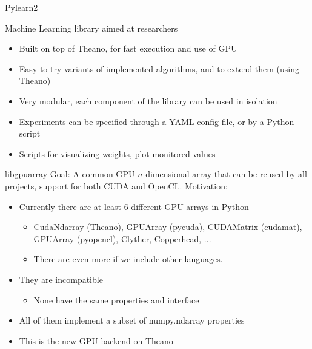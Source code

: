 \documentclass[utf8x,xcolor=pdftex,dvipsnames,table]{beamer}
\begin{document}
\begin{frame}{Pylearn2}

  Machine Learning library aimed at researchers

  \begin{itemize}
    \item Built on top of Theano, for fast execution and use of GPU
    \item Easy to try variants of implemented algorithms, and to extend them (using Theano)
    \item Very modular, each component of the library can be used in isolation
    \item Experiments can be specified through a YAML config file, or by a Python script
    \item Scripts for visualizing weights, plot monitored values
  \end{itemize}
\end{frame}


\begin{frame}{libgpuarray}
  Goal: A common GPU $n$-dimensional array that can be reused by all projects, support for both CUDA and OpenCL.
  \newline \newline
  Motivation:
  \begin{itemize}
  \item Currently there are at least 6 different GPU arrays in Python
    \begin{itemize}
    \item CudaNdarray (Theano), GPUArray (pycuda), CUDAMatrix (cudamat), GPUArray (pyopencl), Clyther, Copperhead, ...
    \item There are even more if we include other languages.
    \end{itemize}
  \item They are incompatible
    \begin{itemize}
    \item None have the same properties and interface
    \end{itemize}
  \item All of them implement a subset of numpy.ndarray properties
  \item This is the new GPU backend on Theano
  \end{itemize}
\end{frame}
\end{document}
